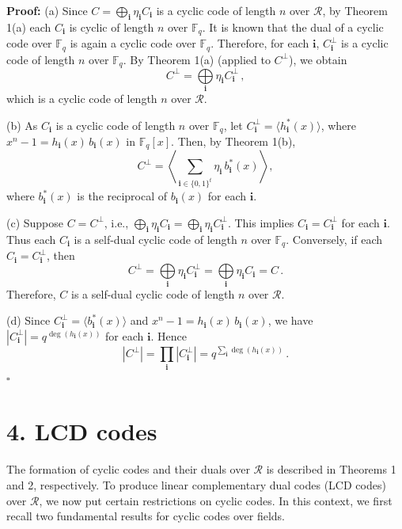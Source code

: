 \documentclass[12pt]{article}
\begin{document}
\textbf{Proof:}
(a) Since $C = \bigoplus_{\mathbf{i}} \eta_{\mathbf{i}} C_{\mathbf{i}}$ is a cyclic code of length $n$ over $\mathcal{R}$, by Theorem 1(a) each $C_{\mathbf{i}}$ is cyclic of length $n$ over $\mathbb{F}_q$. It is known that the dual of a cyclic code over $\mathbb{F}_q$ is again a cyclic code over $\mathbb{F}_q$. Therefore, for each $\mathbf{i}$, $C_{\mathbf{i}}^{\perp}$ is a cyclic code of length $n$ over $\mathbb{F}_q$. By Theorem 1(a) (applied to $C^\perp$), we obtain 
\[
C^{\perp} = \bigoplus\limits_{\mathbf{i}} \eta_{\mathbf{i}} C_{\mathbf{i}}^{\perp}\,,
\] 
which is a cyclic code of length $n$ over $\mathcal{R}$.

(b) As $C_{\mathbf{i}}$ is a cyclic code of length $n$ over $\mathbb{F}_q$, let $C_{\mathbf{i}}^{\perp} = \langle h_{\mathbf{i}}^*(x) \rangle$, where $x^n - 1 = h_{\mathbf{i}}(x)\, b_{\mathbf{i}}(x)$ in $\mathbb{F}_q[x]$. Then, by Theorem 1(b), 
\[
C^{\perp} = \left\langle \sum\limits_{\mathbf{i} \in \{0,1\}^t} \eta_{\mathbf{i}}\, b_{\mathbf{i}}^*(x) \right\rangle,
\] 
where $b_{\mathbf{i}}^*(x)$ is the reciprocal of $b_{\mathbf{i}}(x)$ for each $\mathbf{i}$.

(c) Suppose $C = C^{\perp}$, i.e., $\bigoplus_{\mathbf{i}} \eta_{\mathbf{i}} C_{\mathbf{i}} = \bigoplus_{\mathbf{i}} \eta_{\mathbf{i}} C_{\mathbf{i}}^{\perp}$. This implies $C_{\mathbf{i}} = C_{\mathbf{i}}^{\perp}$ for each $\mathbf{i}$. Thus each $C_{\mathbf{i}}$ is a self-dual cyclic code of length $n$ over $\mathbb{F}_q$. Conversely, if each $C_{\mathbf{i}} = C_{\mathbf{i}}^{\perp}$, then 
\[
C^{\perp} = \bigoplus\limits_{\mathbf{i}} \eta_{\mathbf{i}} C_{\mathbf{i}}^{\perp} = \bigoplus\limits_{\mathbf{i}} \eta_{\mathbf{i}} C_{\mathbf{i}} = C\,.
\] 
Therefore, $C$ is a self-dual cyclic code of length $n$ over $\mathcal{R}$.

(d) Since $C_{\mathbf{i}}^{\perp} = \langle b_{\mathbf{i}}^*(x) \rangle$ and $x^n - 1 = h_{\mathbf{i}}(x)\, b_{\mathbf{i}}(x)$, we have $|C_{\mathbf{i}}^{\perp}| = q^{\deg(h_{\mathbf{i}}(x))}$ for each $\mathbf{i}$. Hence
\[
|C^{\perp}| = \prod_{\mathbf{i}} |C_{\mathbf{i}}^{\perp}| = q^{\sum\limits_{\mathbf{i}} \deg(h_{\mathbf{i}}(x))}\,.
\] 
\hfill $\square$

\section*{4. LCD codes}

The formation of cyclic codes and their duals over $\mathcal{R}$ is described in Theorems 1 and 2, respectively. To produce linear complementary dual codes (LCD codes) over $\mathcal{R}$, we now put certain restrictions on cyclic codes. In this context, we first recall two fundamental results for cyclic codes over fields.
\end{document}
